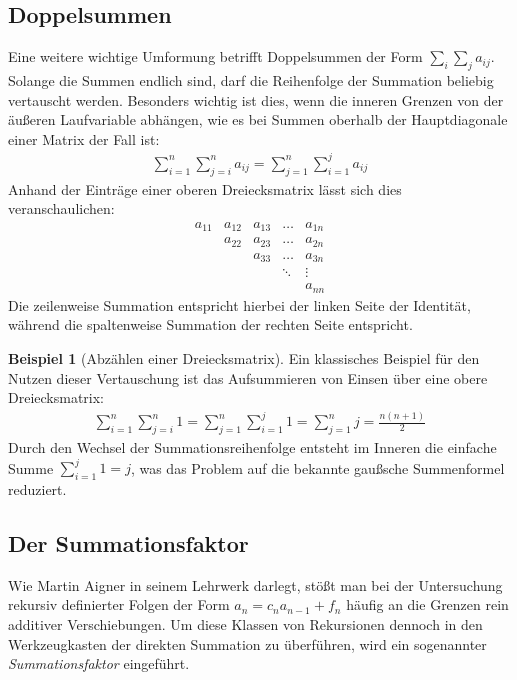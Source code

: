 \documentclass{article}
\theoremstyle{definition}
\newtheorem{bsp}[thm]{Beispiel}
\begin{document}
\subsection{Doppelsummen}
Eine weitere wichtige Umformung betrifft Doppelsummen der Form $\sum_{i} \sum_{j} a_{ij}$. Solange die Summen endlich sind, darf die Reihenfolge der Summation beliebig vertauscht werden. Besonders wichtig ist dies, wenn die inneren Grenzen von der äußeren Laufvariable abhängen, wie es bei Summen oberhalb der Hauptdiagonale einer Matrix der Fall ist:
\begin{align*}
    \sum_{i=1}^n \sum_{j=i}^n a_{ij} = \sum_{j=1}^n \sum_{i=1}^j a_{ij}
\end{align*}
Anhand der Einträge einer oberen Dreiecksmatrix lässt sich dies veranschaulichen:
\[
\begin{matrix}
a_{11} & a_{12} & a_{13} & \dots & a_{1n} \\
       & a_{22} & a_{23} & \dots & a_{2n} \\
       &        & a_{33} & \dots & a_{3n} \\
       &        &        & \ddots & \vdots \\
       &        &        &        & a_{nn}
\end{matrix}
\]
Die zeilenweise Summation entspricht hierbei der linken Seite der Identität, während die spaltenweise Summation der rechten Seite entspricht.

\begin{bsp}[Abzählen einer Dreiecksmatrix]
Ein klassisches Beispiel für den Nutzen dieser Vertauschung ist das Aufsummieren von Einsen über eine obere Dreiecksmatrix:
\begin{align*}
    \sum_{i=1}^n \sum_{j=i}^n 1 = \sum_{j=1}^n \sum_{i=1}^j 1 = \sum_{j=1}^n j = \frac{n(n+1)}{2}
\end{align*}
Durch den Wechsel der Summationsreihenfolge entsteht im Inneren die einfache Summe $\sum_{i=1}^j 1 = j$, was das Problem auf die bekannte gaußsche Summenformel reduziert.
\end{bsp}

\subsection{Der Summationsfaktor}
Wie Martin Aigner in seinem Lehrwerk \cite{aigner} darlegt, stößt man bei der Untersuchung rekursiv definierter Folgen der Form $a_n = c_n a_{n-1} + f_n$ häufig an die Grenzen rein additiver Verschiebungen. Um diese Klassen von Rekursionen dennoch in den Werkzeugkasten der direkten Summation zu überführen, wird ein sogenannter \textit{Summationsfaktor} eingeführt.
\end{document}
